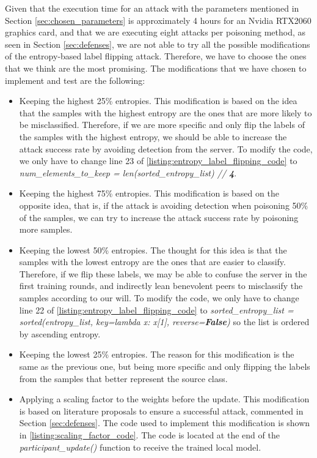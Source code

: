 Given that the execution time for an attack with the parameters mentioned in Section \ref{sec:chosen_parameters} is approximately 4 hours for an Nvidia RTX2060 graphics card, and that we are executing eight attacks per poisoning method, as seen in Section \ref{sec:defenses}, we are not able to try all the possible modifications of the entropy-based label flipping attack. Therefore, we have to choose the ones that we think are the most promising. The modifications that we have chosen to implement and test are the following:
\begin{itemize}
        \item Keeping the highest 25\% entropies. This modification is based on the idea that the samples with the highest entropy are the ones that are more likely to be misclassified. Therefore, if we are more specific and only flip the labels of the samples with the highest entropy, we should be able to increase the attack success rate by avoiding detection from the server. To modify the code, we only have to change line 23 of \autoref{listing:entropy_label_flipping_code} to \textit{num\_elements\_to\_keep = len(sorted\_entropy\_list) // \textbf{4}}.
        \item Keeping the highest 75\% entropies. This modification is based on the opposite idea, that is, if the attack is avoiding detection when poisoning 50\% of the samples, we can try to increase the attack success rate by poisoning more samples.
        \item Keeping the lowest 50\% entropies. The thought for this idea is that the samples with the lowest entropy are the ones that are easier to classify. Therefore, if we flip these labels, we may be able to confuse the server in the first training rounds, and indirectly lean benevolent peers to misclassify the samples according to our will. To modify the code, we only have to change line 22 of \autoref{listing:entropy_label_flipping_code} to \textit{sorted\_entropy\_list = sorted(entropy\_list, key=lambda x: x[1], reverse=\textbf{False})} so the list is ordered by ascending entropy.
        \item Keeping the lowest 25\% entropies. The reason for this modification is the same as the previous one, but being more specific and only flipping the labels from the samples that better represent the source class.
        \item Applying a scaling factor to the weights before the update. This modification is based on literature proposals to ensure a successful attack, commented in Section \ref{sec:defenses}. The code used to implement this modification is shown in \autoref{listing:scaling_factor_code}. The code is located at the end of the \textit{participant\_update()} function to receive the trained local model.
\end{itemize}


